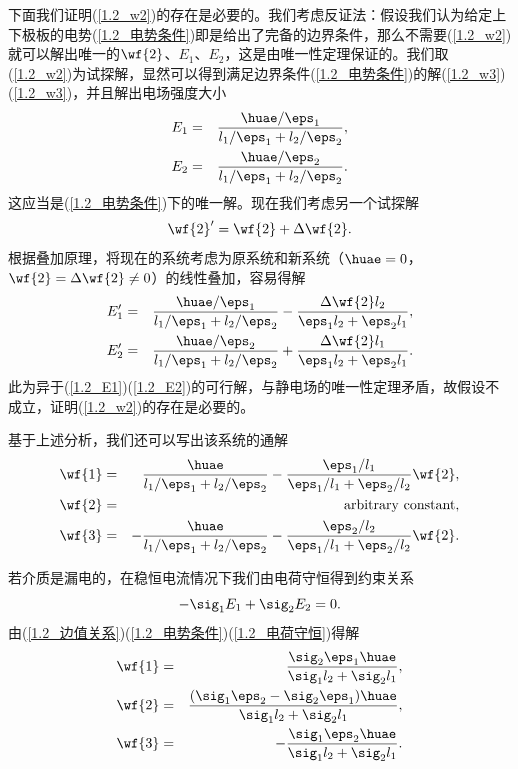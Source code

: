 下面我们证明(\ref{1.2_w2})的存在是必要的。我们考虑反证法：假设我们认为给定上下极板的电势(\ref{1.2_电势条件})即是给出了完备的边界条件，那么不需要(\ref{1.2_w2})就可以解出唯一的$\wf{2}$、$E_1$、$E_2$，这是由唯一性定理保证的。我们取(\ref{1.2_w2})为试探解，显然可以得到满足边界条件(\ref{1.2_电势条件})的解(\ref{1.2_w3})(\ref{1.2_w3})，并且解出电场强度大小
\begin{eqnarray}
    E_1 &=& \frac{\huae/\eps_1}{{l_1}/{\eps_1}+{l_2}/{\eps_2}}, \label{1.2_E1} \\
    E_2 &=& \frac{\huae/\eps_2}{{l_1}/{\eps_1}+{l_2}/{\eps_2}}.  \label{1.2_E2}
\end{eqnarray}
这应当是(\ref{1.2_电势条件})下的唯一解。现在我们考虑另一个试探解
\begin{equation}
    \wf{2}'=\wf{2}+\Delta\wf{2}.
\end{equation}
根据叠加原理，将现在的系统考虑为原系统和新系统（$\huae=0$，$\wf{2}=\Delta\wf{2}\ne0$）的线性叠加，容易得解
\begin{eqnarray}
    E_1' &=& \frac{\huae/\eps_1}{{l_1}/{\eps_1}+{l_2}/{\eps_2}} - \frac{\Delta\wf{2} l_2}{\eps_1 l_2 + \eps_2 l_1} , \label{1.2_E1'} \\
    E_2' &=& \frac{\huae/\eps_2}{{l_1}/{\eps_1}+{l_2}/{\eps_2}} + \frac{\Delta\wf{2} l_1}{\eps_1 l_2 + \eps_2 l_1} .  \label{1.2_E2'}
\end{eqnarray}
此为异于(\ref{1.2_E1})(\ref{1.2_E2})的可行解，与静电场的唯一性定理矛盾，故假设不成立，证明(\ref{1.2_w2})的存在是必要的。

基于上述分析，我们还可以写出该系统的通解
\begin{eqnarray}
    \wf{1} &=& \frac{\huae}{{l_1}/{\eps_1}+{l_2}/{\eps_2}} - \frac{\eps_1/l_1}{\eps_1/l_1 + \eps_2/l_2}\wf{2}, \\
    \wf{2} &=& \mathrm{arbitrary~constant}, \\
    \wf{3} &=& - \frac{\huae}{{l_1}/{\eps_1}+{l_2}/{\eps_2}} - \frac{\eps_2/l_2}{\eps_1/l_1 + \eps_2/l_2}\wf{2}. 
\end{eqnarray}

若介质是漏电的，在稳恒电流情况下我们由电荷守恒得到约束关系
\begin{equation}
    - \sig_1 E_1 + \sig_2 E_2 = 0. \label{1.2_电荷守恒}
\end{equation}
由(\ref{1.2_边值关系})(\ref{1.2_电势条件})(\ref{1.2_电荷守恒})得解
\begin{eqnarray}
    \wf{1} &=& \frac{\sig_2\eps_1\huae}{\sig_1l_2+\sig_2l_1}, \\
    \wf{2} &=& \frac{(\sig_1\eps_2-\sig_2\eps_1)\huae}{\sig_1l_2+\sig_2l_1}, \\
    \wf{3} &=& -\frac{\sig_1\eps_2\huae}{\sig_1l_2+\sig_2l_1}. 
\end{eqnarray}
